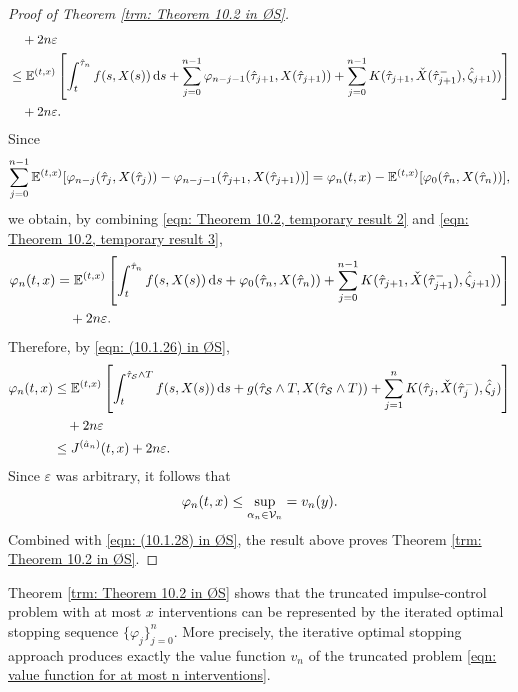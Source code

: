 \begin{proof}[Proof of Theorem \ref{trm: Theorem 10.2 in ØS}]
\begin{align}
        & \quad + 2n\varepsilon \nonumber \\
        & \leq \mathbb{E}^{(t,x)} \left[ \int_t^{\hat{\tau}_n}f(s,X(s)) \,\mathrm{d} s + \sum_{j=0}^{n-1}\varphi_{n-j-1}(\hat{\tau}_{j+1}, X(\hat{\tau}_{j+1})) +  \sum_{j=0}^{n-1} K(\hat{\tau}_{j+1},\check{X}(\hat{\tau}_{j+1}^-), \hat{\zeta}_{j+1}))  \right] \nonumber \\ 
        & \quad + 2n\varepsilon.
        \label{eqn: Theorem 10.2, temporary result 2}
    \end{align}
    Since 
    \begin{equation}
        \sum_{j=0}^{n-1} \mathbb{E}^{(t,x)}[\varphi_{n-j}(\hat{\tau}_j, X(\hat{\tau}_j)) - \varphi_{n-j-1}(\hat{\tau}_{j+1}, X(\hat{\tau}_{j+1}))] = \varphi_n(t,x) - \mathbb{E}^{(t,x)}[\varphi_0(\hat{\tau}_n, X(\hat{\tau}_n))],
        \label{eqn: Theorem 10.2, temporary result 3}
    \end{equation}
    we obtain, by combining \eqref{eqn: Theorem 10.2, temporary result 2} and \eqref{eqn: Theorem 10.2, temporary result 3},
    \begin{align*}
        \varphi_n(t,x) &= \mathbb{E}^{(t,x)} \left[ \int_t^{\hat{\tau}_n}f(s,X(s)) \,\mathrm{d} s + \varphi_0(\hat{\tau}_n, X(\hat{\tau}_n)) +  \sum_{j=0}^{n-1} K(\hat{\tau}_{j+1},\check{X}(\hat{\tau}_{j+1}^-), \hat{\zeta}_{j+1})) \right] \\
        & \quad + 2n \varepsilon.
    \end{align*}
    Therefore, by \eqref{eqn: (10.1.26) in ØS},
    \begin{align*}
        \varphi_n(t,x) &\leq \mathbb{E}^{(t,x)} \left[ \int_t^{\hat{\tau}_\mathcal{S} \wedge T} f(s,X(s)) \,\mathrm{d} s + g(\hat{\tau}_\mathcal{S} \wedge T,X(\hat{\tau}_\mathcal{S} \wedge T)) + \sum_{j=1}^n K(\hat{\tau}_j,\check{X}(\hat{\tau}_j^-),\hat{\zeta}_j)\right] \\
        & \quad + 2n\varepsilon \\
        & \leq J^{(\hat{a}_n)}(t,x) + 2n\varepsilon.
    \end{align*}
    Since $\varepsilon$ was arbitrary, it follows that
    \begin{equation*}
        \varphi_n(t,x) \leq \sup_{\alpha_n \in \mathcal{V}_n} = v_n(y).
    \end{equation*}
    Combined with \eqref{eqn: (10.1.28) in ØS}, the result above proves Theorem \ref{trm: Theorem 10.2 in ØS}.
\end{proof}

Theorem \ref{trm: Theorem 10.2 in ØS} shows that the truncated impulse-control problem with at most $x$ interventions can be represented by the iterated optimal stopping sequence $\{\varphi_j\}_{j=0}^n$. More precisely, the iterative optimal stopping approach produces exactly the value function $v_n$ of the truncated problem \eqref{eqn: value function for at most n interventions}.

